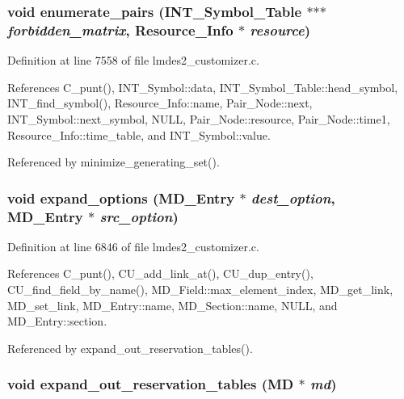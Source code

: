 \subsubsection{\setlength{\rightskip}{0pt plus 5cm}void enumerate\_\-pairs (\bf{INT\_\-Symbol\_\-Table} $\ast$$\ast$$\ast$ {\em forbidden\_\-matrix}, \bf{Resource\_\-Info} $\ast$ {\em resource})}\label{lmdes2__customizer_8c_f5f197f8e2818c8aeebcad98a7af54ba}




Definition at line 7558 of file lmdes2\_\-customizer.c.

References C\_\-punt(), INT\_\-Symbol::data, INT\_\-Symbol\_\-Table::head\_\-symbol, INT\_\-find\_\-symbol(), Resource\_\-Info::name, Pair\_\-Node::next, INT\_\-Symbol::next\_\-symbol, NULL, Pair\_\-Node::resource, Pair\_\-Node::time1, Resource\_\-Info::time\_\-table, and INT\_\-Symbol::value.

Referenced by minimize\_\-generating\_\-set().
\subsubsection{\setlength{\rightskip}{0pt plus 5cm}void expand\_\-options (\bf{MD\_\-Entry} $\ast$ {\em dest\_\-option}, \bf{MD\_\-Entry} $\ast$ {\em src\_\-option})}\label{lmdes2__customizer_8c_77106874c18f2790c5bb0073dadf1313}




Definition at line 6846 of file lmdes2\_\-customizer.c.

References C\_\-punt(), CU\_\-add\_\-link\_\-at(), CU\_\-dup\_\-entry(), CU\_\-find\_\-field\_\-by\_\-name(), MD\_\-Field::max\_\-element\_\-index, MD\_\-get\_\-link, MD\_\-set\_\-link, MD\_\-Entry::name, MD\_\-Section::name, NULL, and MD\_\-Entry::section.

Referenced by expand\_\-out\_\-reservation\_\-tables().
\subsubsection{\setlength{\rightskip}{0pt plus 5cm}void expand\_\-out\_\-reservation\_\-tables (\bf{MD} $\ast$ {\em md})}\label{lmdes2__customizer_8c_fc9ac81a9950e113cd26337a38f6079c}




